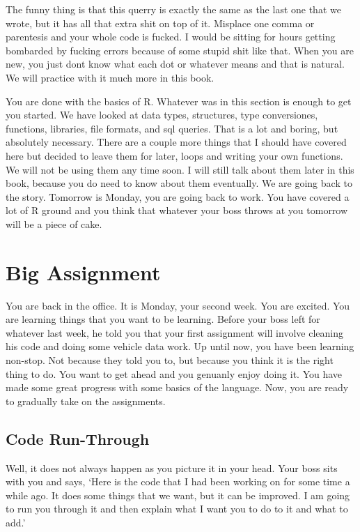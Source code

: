 \documentclass[]{book}
\begin{document}
The funny thing is that this querry is exactly the same as the last one that we wrote, but it has all that extra shit on top of it. Misplace one comma or parentesis and your whole code is fucked. I would be sitting for hours getting bombarded by fucking errors because of some stupid shit like that. When you are new, you just dont know what each dot or whatever means and that is natural. We will practice with it much more in this book.

You are done with the basics of R. Whatever was in this section is enough to get you started. We have looked at data types, structures, type conversiones, functions, libraries, file formats, and sql queries. That is a lot and boring, but absolutely necessary. There are a couple more things that I should have covered here but decided to leave them for later, loops and writing your own functions. We will not be using them any time soon. I will still talk about them later in this book, because you do need to know about them eventually. We are going back to the story. Tomorrow is Monday, you are going back to work. You have covered a lot of R ground and you think that whatever your boss throws at you tomorrow will be a piece of cake.

\hypertarget{big-assignment}{%
\chapter{Big Assignment}\label{big-assignment}}

You are back in the office. It is Monday, your second week. You are excited. You are learning things that you want to be learning. Before your boss left for whatever last week, he told you that your first assignment will involve cleaning his code and doing some vehicle data work. Up until now, you have been learning non-stop. Not because they told you to, but because you think it is the right thing to do. You want to get ahead and you genuanly enjoy doing it. You have made some great progress with some basics of the language. Now, you are ready to gradually take on the assignments.

\hypertarget{code-run-through}{%
\section{Code Run-Through}\label{code-run-through}}

Well, it does not always happen as you picture it in your head. Your boss sits with you and says, `Here is the code that I had been working on for some time a while ago. It does some things that we want, but it can be improved. I am going to run you through it and then explain what I want you to do to it and what to add.'
\end{document}
